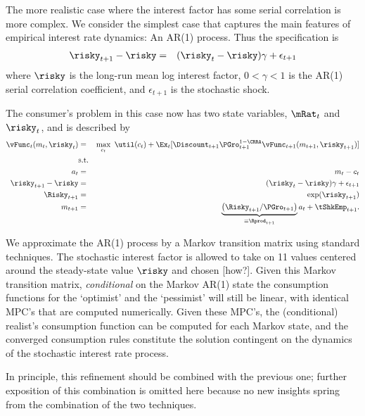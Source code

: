 The more realistic case where the interest factor has some serial correlation is more complex.  We consider
the simplest case that captures the main features of empirical interest rate dynamics: An AR(1) process.  Thus
the specification is
\begin{eqnarray}
  \risky_{t+1}-\risky & = & (\risky_{t}-\risky) \gamma + \epsilon_{t+1}
\end{eqnarray}
where $\risky$ is the long-run mean log interest factor, $0 < \gamma < 1$ is the AR(1) serial correlation
coefficient, and $\epsilon_{t+1}$ is the stochastic shock.

The consumer's problem in this case now has two state variables, $\mRat_{t}$ and $\risky_{t}$, and
is described by
\begin{eqnarray}
        \vFunc_{t}(m_{t},\risky_{t}) & = & \max_{{c}_{t}} ~ \util(c_{t})+
        \Ex_{t}[{\Discount}_{t+1}\PGro_{t+1}^{1-\CRRA}\vFunc_{t+1}(m_{t+1},\risky_{t+1})] \label{vtNormRisky}
\\         & \text{s.t.} &   \nonumber \\
    a_{t}   & = & m_{t}-c_{t} \nonumber
\\      \risky_{t+1}-\risky & = & (\risky_{t}-\risky)\gamma + \epsilon_{t+1} \notag
\\      \Risky_{t+1} & = & \exp(\risky_{t+1}) \notag
\\      m_{t+1} & = & \underbrace{\left(\Risky_{t+1}/\PGro_{t+1}\right)}_{\equiv \Rprod_{t+1}}a_{t}+\tShkEmp_{t+1} \nonumber.
\end{eqnarray}


We approximate the AR(1) process by a Markov transition matrix using standard techniques.  The stochastic interest factor is allowed to take
on 11 values centered around the steady-state value $\risky$ and chosen [how?].  Given this Markov transition matrix,
{\it conditional} on the Markov AR(1) state the consumption functions for the `optimist' and the `pessimist' will still be linear,
with identical MPC's that are computed numerically.  Given these MPC's, the (conditional) realist's consumption function can be computed for each Markov state, and the converged consumption rules constitute the solution contingent on the dynamics of the stochastic
interest rate process.

In principle, this refinement should be combined with the previous one;
further exposition of this combination is omitted here because no new
insights spring from the combination of the two techniques.

